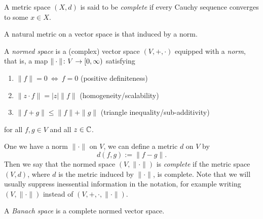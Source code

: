 \begin{definition}
A metric space $(X,d)$ is said to be \emph{complete} if every Cauchy sequence converges to some $x\in X$.
\end{definition}
A natural metric on a vector space is that induced by a norm.
\begin{definition}
A \emph{normed space} is a (complex) vector space
$(V,+,\cdot)$ equipped with a \emph{norm}, that is, a map
$\|\cdot\|\colon V \to [0,\infty)$ satisfying
\begin{enumerate}[label=(\roman*)]
\item $\|f\| = 0 \ \Leftrightarrow\ f=0$ \hfill (positive definiteness)
\item $\|z\cdot f\|=|z|\|f\|$ \hfill (homogeneity/scalability)
\item $\|f+g\|\leq \|f\|+\|g\|$ \hfill (triangle inequality/sub-additivity)
\end{enumerate}
for all $f,g\in V$ and all $z\in \mathbb{C}$.
\end{definition}
One we have a norm $\|\cdot\|$ on $V$, we can define a metric $d$ on $V$ by 
\begin{equation*}
d(f,g) := \|f-g\|.
\end{equation*}
Then we say that the normed space $(V,\|\cdot\|)$ is \emph{complete} if the metric space $(V,d)$, where $d$ is the metric induced by $\|\cdot\|$, is complete. Note that we will usually suppress inessential information in the notation, for example writing $(V,\|\cdot\|)$ instead of $(V,+,\cdot,\|\cdot\|)$.

\begin{definition}
A \emph{Banach space} is a complete normed vector space.
\end{definition}

